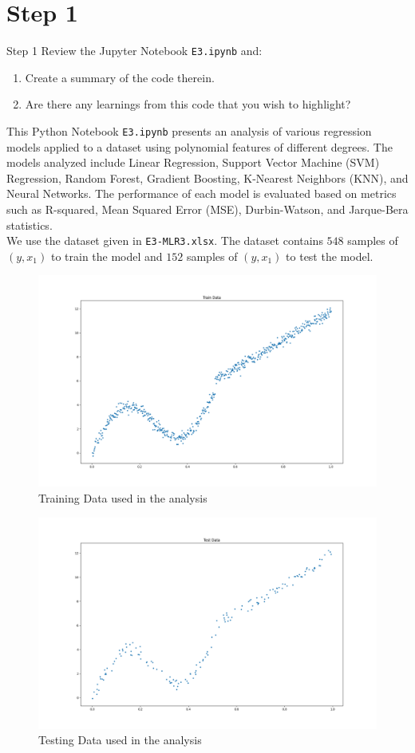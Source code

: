 \section*{Step 1}

\begin{custombox}[label={box:Q1}]{Step 1}
	Review the Jupyter Notebook \verb|E3.ipynb| and:
	\begin{enumerate}[label=(\alph*)]
		\item Create a summary of the code therein.
		\item Are there any learnings from this code that you wish to highlight?
	\end{enumerate}
\end{custombox}

\vspace{5mm}

This Python Notebook \verb|E3.ipynb| presents an analysis of various regression models applied to a dataset using polynomial features of different degrees. The models analyzed include Linear Regression, Support Vector Machine (SVM) Regression, Random Forest, Gradient Boosting, K-Nearest Neighbors (KNN), and Neural Networks. The performance of each model is evaluated based on metrics such as R-squared, Mean Squared Error (MSE), Durbin-Watson, and Jarque-Bera statistics. \\

We use the dataset given in \verb|E3-MLR3.xlsx|. The dataset contains $548$ samples of $(y, x_1)$ to train the model and $152$ samples of $(y, x_1)$ to test the model. 

\begin{figure}[H]
	\centering
	\includegraphics[width=0.7\linewidth]{./Images/E3-MLR3-Train.png}
	\caption{Training Data used in the analysis}
\end{figure}

\begin{figure}[H]
	\centering
	\includegraphics[width=0.7\linewidth]{./Images/E3-MLR3-Test.png}
	\caption{Testing Data used in the analysis}
\end{figure}



\clearpage